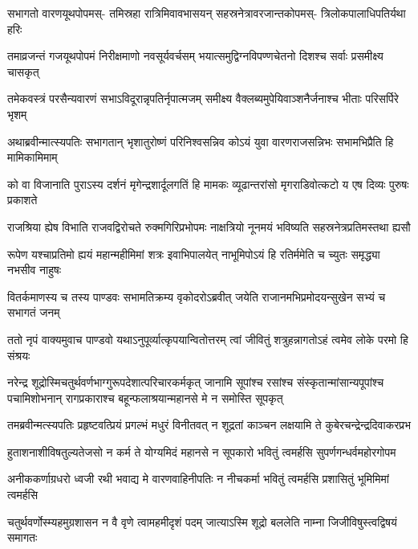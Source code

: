 \fourlineindentedshloka
{सभागतो वारणयूथपोपमस्-}
{तमिस्रहा रात्रिमिवावभासयन्}
{सहस्रनेत्रावरजान्तकोपमस्-}
{त्रिलोकपालाधिपतिर्यथा हरिः}


\fourlineindentedshloka
{तमाव्रजन्तं गजयूथपोपमं निरीक्षमाणो नवसूर्यवर्चसम्}
{भयात्समुद्विग्नविपण्णचेतनो दिशश्च सर्वाः प्रसमीक्ष्य चासकृत्}


\twolineshloka
{तमेकवस्त्रं परसैन्यवारणं सभाऽविदूरान्नृपतिर्नृपात्मजम्}
{समीक्ष्य वैक्लब्यमुपेयिवाञ्शनैर्जनाश्च भीताः परिसर्पिरे भृशम्}


\twolineshloka
{अथाब्रवीन्मात्स्यपतिः सभागतान् भृशातुरोष्णं परिनिश्वसन्निव}
{कोऽयं युवा वारणराजसन्निभः सभामभिप्रैति हि मामिकामिमाम्}


\twolineshloka
{को वा विजानाति पुराऽस्य दर्शनं मृगेन्द्रशार्दूलगतिं हि मामकः}
{व्यूढान्तरांसो मृगराडिवोत्कटो य एष दिव्यः पुरुषः प्रकाशते}


\twolineshloka
{राजश्रिया ह्येष विभाति राजवद्विरोचते रुक्मगिरिप्रभोपमः}
{नाक्षत्रियो नूनमयं भविष्यति सहस्रनेत्रप्रतिमस्तथा ह्यसौ}


\twolineshloka
{रूपेण यश्चाप्रतिमो ह्ययं महान्महीमिमां शत्रः इवाभिपालयेत्}
{नाभूमिपोऽयं हि रतिर्ममेति च च्युतः समृद्ध्या नभसीव नाहुषः}



\twolineshloka
{वितर्कमाणस्य च तस्य पाण्डवः सभामतिक्रम्य वृकोदरोऽब्रवीत्}
{जयेति राजानमभिप्रमोदयन्सुखेन सभ्यं च सभागतं जनम्}


\twolineshloka
{ततो नृपं वाक्यमुवाच पाण्डवो यथाऽनुपूर्व्यात्कृपयान्वितोत्तरम्}
{त्वां जीवितुं शत्रुहन्नागतोऽहं त्वमेव लोके परमो हि संश्रयः}


\threelineshloka
{नरेन्द्र शूद्रोस्मिचतुर्थवर्णभाग्गुरूपदेशात्परिचारकर्मकृत्}
{जानामि सूपांश्च रसांश्च संस्कृतान्मांसान्यपूपांश्च पचामिशोभनान्}
{रागप्रकाराश्च बहून्फलाश्रयान्महानसे मे न समोस्ति सूपकृत्}



\twolineshloka
{तमब्रवीन्मत्स्यपतिः प्रहृष्टवत्प्रियं प्रगल्भं मधुरं विनीतवत्}
{न शूद्रतां काञ्चन लक्षयामि ते कुबेरचन्द्रेन्द्रदिवाकरप्रभ}


\twolineshloka
{हुताशनाशीविषतुल्यतेजसो न कर्म ते योग्यमिदं महानसे}
{न सूपकारो भवितुं त्वमर्हसि सुपर्णगन्धर्वमहोरगोपम}


\twolineshloka
{अनीककर्णाग्रधरो ध्वजी रथी भवाद्य मे वारणवाहिनीपतिः}
{न नीचकर्मा भवितुं त्वमर्हसि प्रशासितुं भूमिमिमां त्वमर्हसि}




\twolineshloka
{चतुर्थवर्णोस्म्यहमुग्रशासन न वै वृणे त्वामहमीदृशं पदम्}
{जात्याऽस्मि शूद्रो बललेति नाम्ना जिजीविषुस्त्वद्विषयं समागतः}



